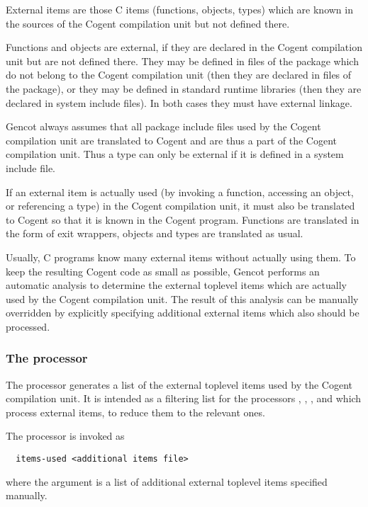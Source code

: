 External items are those C items (functions, objects, types) which are known in the sources of the Cogent compilation
unit but not defined there. 

Functions and objects are external, if they are declared in the 
Cogent compilation unit but are not defined there. They may be defined in files of the package which do not belong to
the Cogent compilation unit (then they are declared in  files of the package), or they may be defined in 
standard runtime libraries (then they are declared in system include files). In both cases they must have external linkage.

Gencot always assumes that all package include files used by the Cogent compilation unit are translated to Cogent and
are thus a part of the Cogent compilation unit. Thus a type can only be external if it is defined in a system include
file.

If an external item is actually used (by invoking a function, accessing an object, or referencing a type) in the Cogent
compilation unit, it must also be translated to Cogent so that it is known in the Cogent program. Functions are translated
in the form of exit wrappers, objects and types are translated as usual.

Usually, C programs know many external items without actually using them. To keep the resulting Cogent code as small 
as possible, Gencot performs an automatic analysis to determine the external toplevel items which are actually used
by the Cogent compilation unit. The result of this analysis can be manually overridden by explicitly specifying additional
external items which also should be processed.

\subsubsection{The processor }

The processor  generates a list of the external toplevel items used by the Cogent compilation unit.
It is intended as a filtering list for the processors , , ,
 and  which process external items, to reduce them to the relevant ones.

The processor is invoked as
\begin{verbatim}
  items-used <additional items file>
\end{verbatim}
where the argument is a list of additional external toplevel items specified manually.

